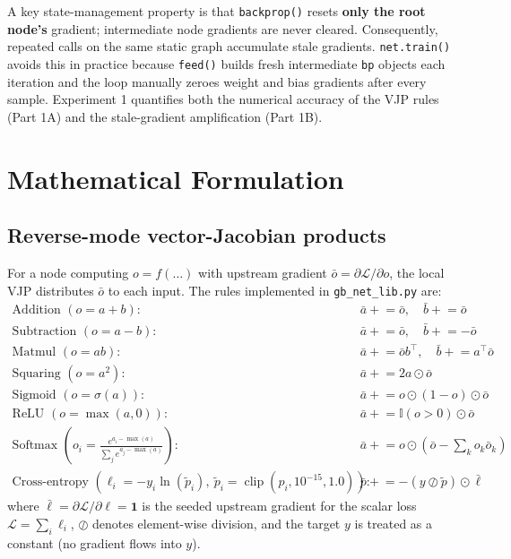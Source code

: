 \documentclass[11pt,a4paper]{article}
\begin{document}
A key state-management property is that \texttt{backprop()} resets \textbf{only the root node's} gradient; intermediate node gradients are never cleared. Consequently, repeated calls on the same static graph accumulate stale gradients. \texttt{net.train()} avoids this in practice because \texttt{feed()} builds fresh intermediate \texttt{bp} objects each iteration and the loop manually zeroes weight and bias gradients after every sample. Experiment 1 quantifies both the numerical accuracy of the VJP rules (Part 1A) and the stale-gradient amplification (Part 1B).

\section{Mathematical Formulation}

\subsection{Reverse-mode vector-Jacobian products}
For a node computing $o = f(\ldots)$ with upstream gradient $\bar{o} = \partial\mathcal{L}/\partial o$, the local VJP distributes $\bar{o}$ to each input. The rules implemented in \texttt{gb\_net\_lib.py} are:
\begin{align*}
\text{Addition }(o=a+b):&\quad \bar{a} \mathrel{+}= \bar{o}, \quad \bar{b} \mathrel{+}= \bar{o} \\
\text{Subtraction }(o=a-b):&\quad \bar{a} \mathrel{+}= \bar{o}, \quad \bar{b} \mathrel{+}= -\bar{o} \\
\text{Matmul }(o=ab):&\quad \bar{a} \mathrel{+}= \bar{o}b^\top, \quad \bar{b} \mathrel{+}= a^\top\bar{o} \\
\text{Squaring }(o=a^2):&\quad \bar{a} \mathrel{+}= 2a \odot \bar{o} \\
\text{Sigmoid }(o=\sigma(a)):&\quad \bar{a} \mathrel{+}= o \odot (1-o) \odot \bar{o} \\
\text{ReLU }(o=\max(a,0)):&\quad \bar{a} \mathrel{+}= \mathbb{I}(o>0) \odot \bar{o} \\
\text{Softmax }\!\left(o_i=\frac{e^{a_i-\max(a)}}{\sum_j e^{a_j-\max(a)}}\right):&\quad
\bar{a} \mathrel{+}= o \odot \left(\bar{o} - \sum_k o_k\bar{o}_k\right) \\
\text{Cross-entropy }\!\left(\ell_i=-y_i\ln(\tilde p_i),\ \tilde p_i=\operatorname{clip}(p_i,10^{-15},1.0)\right):&\quad
\bar p \mathrel{+}= -\left(y\oslash\tilde p\right)\odot\bar{\boldsymbol{\ell}}
\end{align*}
where $\bar{\boldsymbol{\ell}} = \partial\mathcal{L}/\partial\boldsymbol{\ell} = \mathbf{1}$ is the seeded upstream gradient for the scalar loss $\mathcal{L}=\sum_i\ell_i$, $\oslash$ denotes element-wise division, and the target $y$ is treated as a constant (no gradient flows into $y$).
\end{document}
